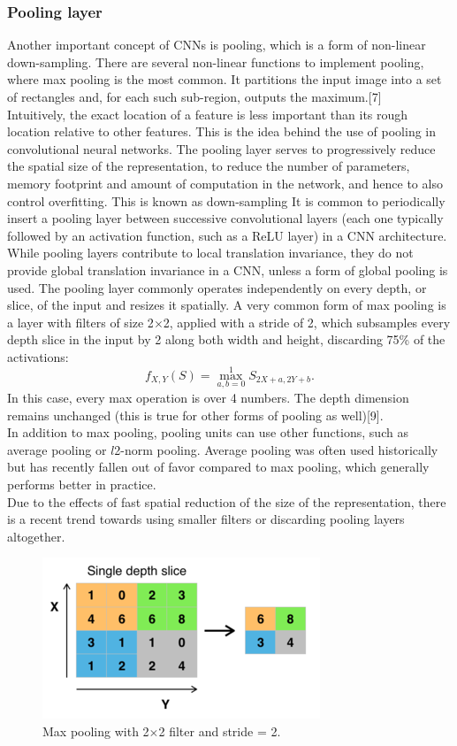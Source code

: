 \documentclass[12pt,a4paper]{article}
\begin{document}
\subsubsection{Pooling layer}
Another important concept of CNNs is pooling, which is a form of non-linear down-sampling. There are several non-linear functions to implement pooling, where max pooling is the most common. It partitions the input image into a set of rectangles and, for each such sub-region, outputs the maximum.[7]\\
Intuitively, the exact location of a feature is less important than its rough location relative to other features. This is the idea behind the use of pooling in convolutional neural networks. The pooling layer serves to progressively reduce the spatial size of the representation, to reduce the number of parameters, memory footprint and amount of computation in the network, and hence to also control overfitting. This is known as down-sampling It is common to periodically insert a pooling layer between successive convolutional layers (each one typically followed by an activation function, such as a ReLU layer) in a CNN architecture. While pooling layers contribute to local translation invariance, they do not provide global translation invariance in a CNN, unless a form of global pooling is used. The pooling layer commonly operates independently on every depth, or slice, of the input and resizes it spatially. A very common form of max pooling is a layer with filters of size 2$\times$2, applied with a stride of 2, which subsamples every depth slice in the input by 2 along both width and height, discarding 75\% of the activations:
\[\displaystyle f_{X,Y}(S)=\max _{a,b=0}^{1}S_{2X+a,2Y+b}.\]
In this case, every max operation is over 4 numbers. The depth dimension remains unchanged (this is true for other forms of pooling as well)[9].\\
In addition to max pooling, pooling units can use other functions, such as average pooling or $l$2-norm pooling. Average pooling was often used historically but has recently fallen out of favor compared to max pooling, which generally performs better in practice.\\
Due to the effects of fast spatial reduction of the size of the representation, there is a recent trend towards using smaller filters or discarding pooling layers altogether.
\begin{figure}[h]
\centerline{\includegraphics[scale=1]{314px-Max_pooling.png}}
\caption{Max pooling with 2$\times$2 filter and stride = 2.}
\label{fig 10}
\end{figure}
\end{document}
